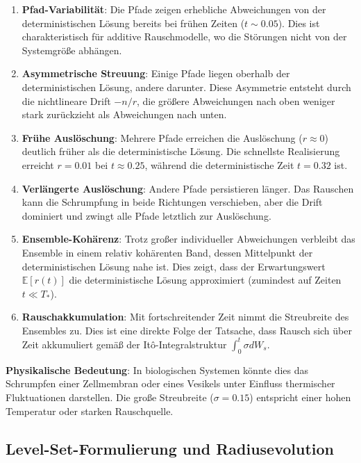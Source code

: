 \documentclass[a4paper,12pt]{article}
\theoremstyle{definition}
\begin{document}
\begin{enumerate}
	\item \textbf{Pfad-Variabilität}: Die Pfade zeigen erhebliche Abweichungen von der deterministischen Lösung bereits bei frühen Zeiten ($t \sim 0.05$). Dies ist charakteristisch für additive Rauschmodelle, wo die Störungen nicht von der Systemgröße abhängen.
	
	\item \textbf{Asymmetrische Streuung}: Einige Pfade liegen oberhalb der deterministischen Lösung, andere darunter. Diese Asymmetrie entsteht durch die nichtlineare Drift $-n/r$, die größere Abweichungen nach oben weniger stark zurückzieht als Abweichungen nach unten.
	
	\item \textbf{Frühe Auslöschung}: Mehrere Pfade erreichen die Auslöschung ($r \approx 0$) deutlich früher als die deterministische Lösung. Die schnellste Realisierung erreicht $r = 0.01$ bei $t \approx 0.25$, während die deterministische Zeit $t = 0.32$ ist.
	
	\item \textbf{Verlängerte Auslöschung}: Andere Pfade persistieren länger. Das Rauschen kann die Schrumpfung in beide Richtungen verschieben, aber die Drift dominiert und zwingt alle Pfade letztlich zur Auslöschung.
	
	\item \textbf{Ensemble-Kohärenz}: Trotz großer individueller Abweichungen verbleibt das Ensemble in einem relativ kohärenten Band, dessen Mittelpunkt der deterministischen Lösung nahe ist. Dies zeigt, dass der Erwartungswert $\mathbb{E}[r(t)]$ die deterministische Lösung approximiert (zumindest auf Zeiten $t \ll T_*$).
	
	\item \textbf{Rauschakkumulation}: Mit fortschreitender Zeit nimmt die Streubreite des Ensembles zu. Dies ist eine direkte Folge der Tatsache, dass Rausch sich über Zeit akkumuliert gemäß der Itô-Integralstruktur $\int_0^t \sigma dW_s$.
\end{enumerate}

\textbf{Physikalische Bedeutung}: In biologischen Systemen könnte dies das Schrumpfen einer Zellmembran oder eines Vesikels unter Einfluss thermischer Fluktuationen darstellen. Die große Streubreite ($\sigma = 0.15$) entspricht einer hohen Temperatur oder starken Rauschquelle.

\subsection{Level-Set-Formulierung und Radiusevolution}
\end{document}
